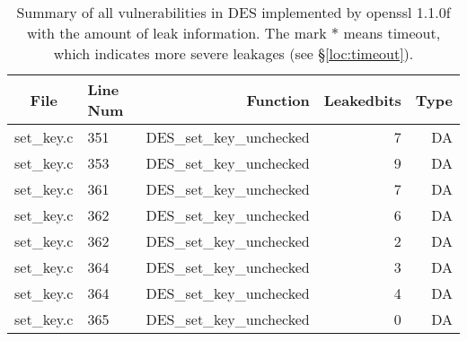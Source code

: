 \begin{table}%
\centering\tiny
\caption{Summary of all vulnerabilities in DES implemented by openssl 1.1.0f with the amount of leak information. The mark $*$ means timeout, which indicates more severe leakages (see \S\ref{loc:timeout}).}\label{tab:DESopenssl}
\begin{tabular}{clrrr}
\hline
\textbf{File} & \textbf{Line Num} & \textbf{Function} & \textbf{Leakedbits} & \textbf{Type} \\\hline
set\_key.c& 351&DES\_set\_key\_unchecked&7 &DA\\
set\_key.c& 353&DES\_set\_key\_unchecked&9 &DA\\
set\_key.c& 361&DES\_set\_key\_unchecked&7 &DA\\
set\_key.c& 362&DES\_set\_key\_unchecked&6 &DA\\
set\_key.c& 362&DES\_set\_key\_unchecked&2 &DA\\
set\_key.c& 364&DES\_set\_key\_unchecked&3 &DA\\
set\_key.c& 364&DES\_set\_key\_unchecked&4 &DA\\
set\_key.c& 365&DES\_set\_key\_unchecked&0 &DA\\
\hline
\end{tabular}
\end{table}